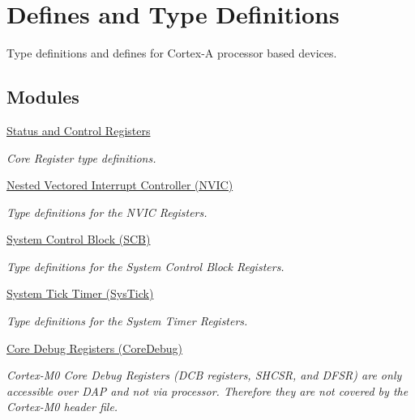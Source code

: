 \hypertarget{group__CMSIS__core__register}{}\section{Defines and Type Definitions}
\label{group__CMSIS__core__register}


Type definitions and defines for Cortex-\/A processor based devices.  


\subsection*{Modules}
\begin{DoxyCompactItemize}
\item 
\hyperlink{group__CMSIS__CORE}{Status and Control Registers}
\begin{DoxyCompactList}\small\item\em Core Register type definitions. \end{DoxyCompactList}\item 
\hyperlink{group__CMSIS__NVIC}{Nested Vectored Interrupt Controller (\+N\+V\+I\+C)}
\begin{DoxyCompactList}\small\item\em Type definitions for the N\+V\+IC Registers. \end{DoxyCompactList}\item 
\hyperlink{group__CMSIS__SCB}{System Control Block (\+S\+C\+B)}
\begin{DoxyCompactList}\small\item\em Type definitions for the System Control Block Registers. \end{DoxyCompactList}\item 
\hyperlink{group__CMSIS__SysTick}{System Tick Timer (\+Sys\+Tick)}
\begin{DoxyCompactList}\small\item\em Type definitions for the System Timer Registers. \end{DoxyCompactList}\item 
\hyperlink{group__CMSIS__CoreDebug}{Core Debug Registers (\+Core\+Debug)}
\begin{DoxyCompactList}\small\item\em Cortex-\/\+M0 Core Debug Registers (D\+CB registers, S\+H\+C\+SR, and D\+F\+SR) are only accessible over D\+AP and not via processor. Therefore they are not covered by the Cortex-\/\+M0 header file. \end{DoxyCompactList}\item 

\end{DoxyCompactItemize}
